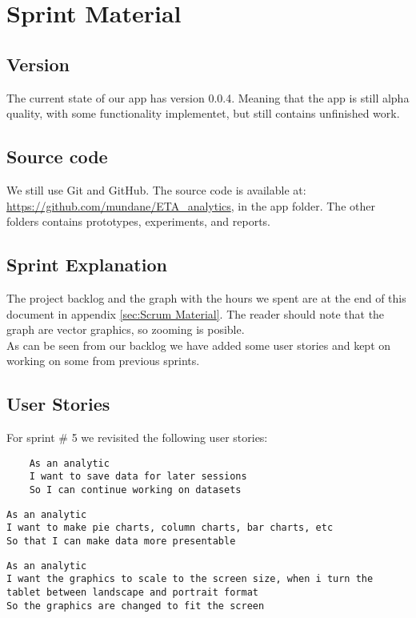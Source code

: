 \section{Sprint Material} %
\label{sec:Sprint Material}
\subsection{Version} %
\label{sub:Version}
The current state of our app has version 0.0.4. Meaning that the app is still alpha quality, with some functionality implementet, but still contains unfinished work.
\subsection{Source code} %
\label{sub:Source code}
We still use Git and GitHub. The source code is available at: \url{https://github.com/mundane/ETA_analytics}, in the app folder. The other folders contains prototypes, experiments, and reports.
\subsection{Sprint Explanation}%

The project backlog and the graph with the hours we spent are at the end of this document in appendix \ref{sec:Scrum Material}. The reader should note that the graph are vector graphics, so zooming is posible. \\
As can be seen from our backlog we have added some user stories and kept on working on some from previous sprints.
\subsection{User Stories}
For sprint \# 5 we revisited the following user stories: \\
\begin{verbatim}
	As an analytic
	I want to save data for later sessions
	So I can continue working on datasets
\end{verbatim}
\begin{verbatim}
As an analytic
I want to make pie charts, column charts, bar charts, etc
So that I can make data more presentable
\end{verbatim}
\begin{verbatim}
As an analytic
I want the graphics to scale to the screen size, when i turn the tablet between landscape and portrait format
So the graphics are changed to fit the screen
\end{verbatim}
